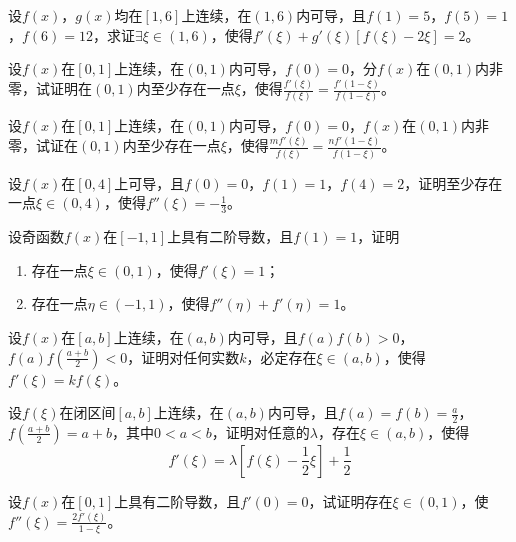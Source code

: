 \begin{example}
	设$f(x)$，$g(x)$均在$[1,6]$上连续，在$(1,6)$内可导，且$f(1)=5$，$f(5)=1$，$f(6)=12$，求证$\exists\xi\in(1,6)$，使得$f'(\xi)+g'(\xi)[f(\xi)-2\xi]=2$。
\end{example}

\begin{example}
	设$f(x)$在$[0,1]$上连续，在$(0,1)$内可导，$f(0)=0$，$分f(x)$在$(0,1)$内非零，试证明在$(0,1)$内至少存在一点$\xi$，使得$\frac{f'(\xi)}{f(\xi)}=\frac{f'(1-\xi)}{f(1-\xi)}$。
\end{example}
\begin{example}
	设$f(x)$在$[0,1]$上连续，在$(0,1)$内可导，$f(0)=0$，$f(x)$在$(0,1)$内非零，试证在$(0,1)$内至少存在一点$\xi$，使得$\frac{mf'(\xi)}{f(\xi)}=\frac{nf'(1-\xi)}{f(1-\xi)}$。
\end{example}

\begin{example}
	设$f(x)$在$[0,4]$上可导，且$f(0)=0$，$f(1)=1$，$f(4)=2$，证明至少存在一点$\xi\in(0,4)$，使得$f''(\xi)=-\frac{1}{3}$。
\end{example}

\begin{example}
	设奇函数$f(x)$在$[-1,1]$上具有二阶导数，且$f(1)=1$，证明
	\begin{enumerate}
		\item 存在一点$\xi\in(0,1)$，使得$f'(\xi)=1$；
		\item 存在一点$\eta\in(-1,1)$，使得$f''(\eta)+f'(\eta)=1$。
	\end{enumerate}
\end{example}

\begin{example}
	设$f(x)$在$[a,b]$上连续，在$(a,b)$内可导，且$f(a)f(b)>0$，$f(a)f(\frac{a+b}{2})<0$，证明对任何实数$k$，必定存在$\xi\in(a,b)$，使得$f'(\xi)=kf(\xi)$。
\end{example}

\begin{example}
	设$f(\xi)$在闭区间$[a,b]$上连续，在$(a,b)$内可导，且$f(a)=f(b)=\frac{a}{2}$，$f(\frac{a+b}{2})=a+b$，其中$0<a<b$，证明对任意的$\lambda$，存在$\xi\in(a,b)$，使得\[f'(\xi)=\lambda\left[f(\xi)-\frac{1}{2}\xi\right]+\frac{1}{2}\]
\end{example}

\begin{example}
	设$f(x)$在$[0,1]$上具有二阶导数，且$f'(0)=0$，试证明存在$\xi\in(0,1)$，使$f''(\xi)=\frac{2f'(\xi)}{1-\xi}$。
\end{example}

